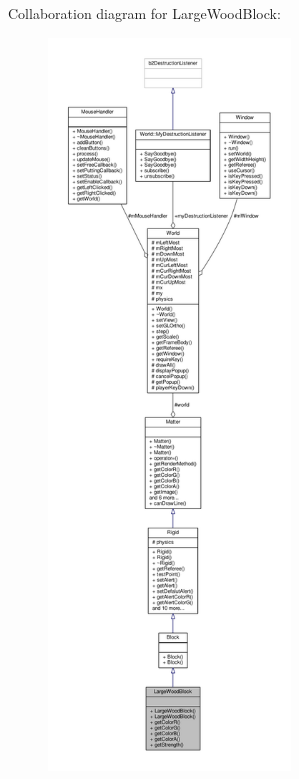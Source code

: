 Collaboration diagram for Large\+Wood\+Block\+:\nopagebreak
\begin{figure}[H]
\begin{center}
\leavevmode
\includegraphics[height=550pt]{classLargeWoodBlock__coll__graph}
\end{center}
\end{figure}
